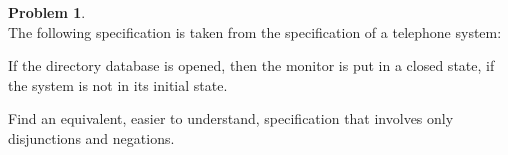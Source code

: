 \documentclass{article}
\theoremstyle{definition}
\newtheorem{problem}{Problem}
\newtheorem*{solution}{Solution}
\begin{document}


\begin{problem}\ \\
The following specification is taken from the specification of a telephone system:
\begin{displayquote}
If the directory database is opened, then the monitor is put in a closed state, if the system is not in its initial state.
\end{displayquote}
Find an equivalent, easier to understand, specification that involves only disjunctions and negations.
\end{problem}


\end{document}
